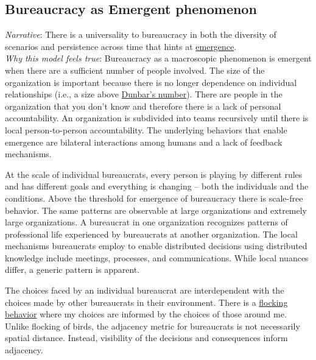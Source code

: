 

\subsection*{Bureaucracy as Emergent phenomenon}

\textit{Narrative}: There is a universality to bureaucracy in both the diversity of scenarios and persistence across time that hints at \href{https://en.wikipedia.org/wiki/Emergence}{emergence}.\\
\textit{Why this model feels true}: Bureaucracy as a macroscopic phenomenon is emergent when there are a sufficient number of people involved. The size of the organization is important because there is no longer dependence on individual relationships (i.e., a size above \href{https://en.wikipedia.org/wiki/Dunbar\%27s_number}{Dunbar's number}). 
There are people in the organization that you don't know and therefore there is a lack of personal accountability. An organization is subdivided into teams recursively until there is local person-to-person accountability.  The underlying behaviors that enable emergence are bilateral interactions among humans and a lack of feedback mechanisms. 

At the scale of individual bureaucrats, every person is playing by different rules and has different goals and everything is changing -- both the individuals and the conditions. 
Above the threshold for emergence of bureaucracy there is scale-free behavior. The same patterns are observable at large organizations and extremely large organizations. A bureaucrat in one organization recognizes patterns of professional life experienced by bureaucrats at another organization. The local mechanisms bureaucrats employ to enable distributed decisions using distributed knowledge include meetings, processes, and communications. While local nuances differ, a generic pattern is apparent. 

The choices faced by an individual bureaucrat are interdependent with the choices made by other bureaucrats in their environment. There is a \href{https://en.wikipedia.org/wiki/Flocking_(behavior)}{flocking behavior} 
where my choices are informed by the choices of those around me. Unlike flocking of birds, the adjacency metric for bureaucrats is not necessarily spatial distance. Instead, visibility of the decisions and consequences inform adjacency.


